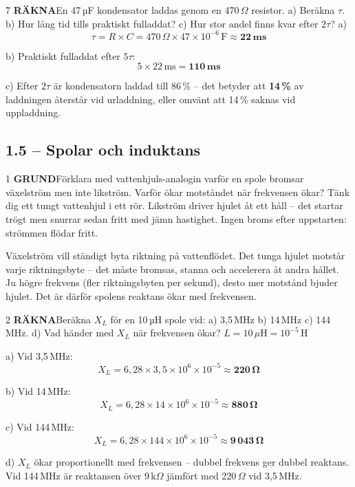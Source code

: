 \documentclass[a4paper,11pt,twoside]{book}
\newcommand{\qgrund}{\colorbox{greenpale}{\textcolor{greendark}{\headingfont\bfseries\tiny GRUND}}}
\newcommand{\qrakna}{\colorbox{bluepale}{\textcolor{bluedark}{\headingfont\bfseries\tiny RÄKNA}}}
\begin{document}
\begin{facitblock}{7}
\qrakna\quad En 47\,µF kondensator laddas genom en 470\,$\Omega$ resistor. a) Beräkna $\tau$. b) Hur lång tid tills praktiskt fulladdat? c) Hur stor andel finns kvar efter $2\tau$?
\tcblower
a)
\[ \tau = R \times C = 470\,\Omega \times 47 \times 10^{-6}\,\text{F} \approx \mathbf{22\,\text{ms}} \]

b) Praktiskt fulladdat efter $5\tau$:
\[ 5 \times 22\,\text{ms} = \mathbf{110\,\text{ms}} \]

c) Efter $2\tau$ är kondensatorn laddad till 86\,\% -- det betyder att \textbf{14\,\%} av laddningen återstår vid urladdning, eller omvänt att 14\,\% saknas vid uppladdning.
\end{facitblock}

\subsection*{1.5 -- Spolar och induktans}

\begin{facitblock}{1}
\qgrund\quad Förklara med vattenhjuls-analogin varför en 
spole bromsar växelström men inte likström. Varför ökar 
motståndet när frekvensen ökar?
\tcblower
Tänk dig ett tungt vattenhjul i ett rör. Likström driver 
hjulet åt ett håll -- det startar trögt men snurrar sedan 
fritt med jämn hastighet. Ingen broms efter uppstarten: 
strömmen flödar fritt.

Växelström vill ständigt byta riktning på vattenflödet. 
Det tunga hjulet motstår varje riktningsbyte -- det måste 
bromsas, stanna och accelerera åt andra hållet. Ju högre 
frekvens (fler riktningsbyten per sekund), desto mer 
motstånd bjuder hjulet. Det är därför spolens reaktans 
ökar med frekvensen.
\end{facitblock}

\begin{facitblock}{2}
\qrakna\quad Beräkna $X_L$ för en 10\,µH spole vid: 
a) 3,5\,MHz \quad b) 14\,MHz \quad c) 144\,MHz. \quad 
d) Vad händer med $X_L$ när frekvensen ökar?
\tcblower
$L = 10\,\mu\text{H} = 10^{-5}\,\text{H}$

a) Vid 3,5\,MHz:
\[ X_L = 6{,}28 \times 3{,}5 \times 10^6 \times 10^{-5} \approx \mathbf{220\,\Omega} \]

b) Vid 14\,MHz:
\[ X_L = 6{,}28 \times 14 \times 10^6 \times 10^{-5} \approx \mathbf{880\,\Omega} \]

c) Vid 144\,MHz:
\[ X_L = 6{,}28 \times 144 \times 10^6 \times 10^{-5} \approx \mathbf{9\,043\,\Omega} \]

d) $X_L$ ökar proportionellt med frekvensen -- dubbel 
frekvens ger dubbel reaktans. Vid 144\,MHz är reaktansen 
över 9\,k$\Omega$ jämfört med 220\,$\Omega$ vid 3,5\,MHz.
\end{facitblock}
\end{document}
